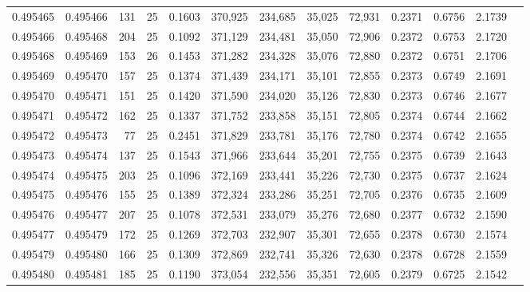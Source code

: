 \begin{tabular}{rrrrrrrrrrrrr}
0.495465 & 0.495466 &   131 &  25 &                                     0.1603 & 370,925 & 234,685 &  35,025 &  72,931 & 0.2371 & 0.6756 & 2.1739 \\
0.495466 & 0.495468 &   204 &  25 &                                     0.1092 & 371,129 & 234,481 &  35,050 &  72,906 & 0.2372 & 0.6753 & 2.1720 \\
0.495468 & 0.495469 &   153 &  26 &                                     0.1453 & 371,282 & 234,328 &  35,076 &  72,880 & 0.2372 & 0.6751 & 2.1706 \\
0.495469 & 0.495470 &   157 &  25 &                                     0.1374 & 371,439 & 234,171 &  35,101 &  72,855 & 0.2373 & 0.6749 & 2.1691 \\
0.495470 & 0.495471 &   151 &  25 &                                     0.1420 & 371,590 & 234,020 &  35,126 &  72,830 & 0.2373 & 0.6746 & 2.1677 \\
0.495471 & 0.495472 &   162 &  25 &                                     0.1337 & 371,752 & 233,858 &  35,151 &  72,805 & 0.2374 & 0.6744 & 2.1662 \\
0.495472 & 0.495473 &    77 &  25 &                                     0.2451 & 371,829 & 233,781 &  35,176 &  72,780 & 0.2374 & 0.6742 & 2.1655 \\
0.495473 & 0.495474 &   137 &  25 &                                     0.1543 & 371,966 & 233,644 &  35,201 &  72,755 & 0.2375 & 0.6739 & 2.1643 \\
0.495474 & 0.495475 &   203 &  25 &                                     0.1096 & 372,169 & 233,441 &  35,226 &  72,730 & 0.2375 & 0.6737 & 2.1624 \\
0.495475 & 0.495476 &   155 &  25 &                                     0.1389 & 372,324 & 233,286 &  35,251 &  72,705 & 0.2376 & 0.6735 & 2.1609 \\
0.495476 & 0.495477 &   207 &  25 &                                     0.1078 & 372,531 & 233,079 &  35,276 &  72,680 & 0.2377 & 0.6732 & 2.1590 \\
0.495477 & 0.495479 &   172 &  25 &                                     0.1269 & 372,703 & 232,907 &  35,301 &  72,655 & 0.2378 & 0.6730 & 2.1574 \\
0.495479 & 0.495480 &   166 &  25 &                                     0.1309 & 372,869 & 232,741 &  35,326 &  72,630 & 0.2378 & 0.6728 & 2.1559 \\
0.495480 & 0.495481 &   185 &  25 &                                     0.1190 & 373,054 & 232,556 &  35,351 &  72,605 & 0.2379 & 0.6725 & 2.1542 \\

\end{tabular}
